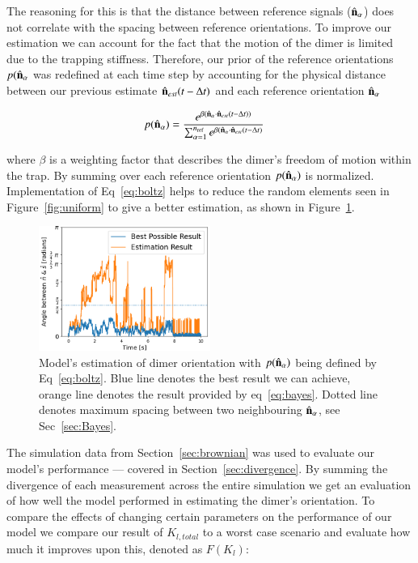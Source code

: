 \documentclass[final,  3p]{elsarticle}
\begin{document}
The reasoning for this is that the distance between reference signals ($\hat{\bf n}_\alpha$) does not correlate with the spacing between reference orientations. To improve our estimation we can account for the fact that the motion of the dimer is limited due to the trapping stiffness. Therefore, our prior of the reference orientations $p(\hat{\bf n}_\alpha$ was redefined at each time step by accounting for the physical distance between our previous estimate $\hat{\bf n}_{est}(t-\Delta t)$ and each reference orientation $\hat{\bf n}_\alpha$

\begin{align}
  p(\hat{\bf n}_\alpha)
  &=\frac{e^{\beta (\hat{\bf n}_\alpha 
  	\cdot \hat{\bf n}_{est}(t-\Delta t))}}
  {\sum_{\alpha=1}^{n_{\rm ref}}
	e^{\beta (\hat{\bf n}_\alpha 
	\cdot \hat{\bf n}_{est}(t-\Delta t)}}
	\label{eq:boltz}
\end{align}

where $\beta$ is a weighting factor that describes the dimer's freedom of motion within the trap. By summing over each reference orientation $p(\hat{\bf n}_\alpha)$ is normalized. Implementation of Eq~\eqref{eq:boltz} helps to reduce the random elements seen in  Figure~\ref{fig:uniform} to give a better estimation, as shown in Figure~\ref{fig:biased}. 

\begin{figure}[h]
	\centering
	\includegraphics[width=0.5\textwidth]{./Images/fig4.png}
	\caption{Model's estimation of dimer orientation with $p(\hat{\bf n}_\alpha)$ being defined by Eq~\eqref{eq:boltz}. Blue line denotes the best result we can achieve, orange line denotes the result provided by eq~\ref{eq:bayes}. Dotted line denotes maximum spacing between two neighbouring $\hat{\bf n}_\alpha$, see Sec~\ref{sec:Bayes}.}
	\label{fig:biased}
\end{figure} 
 
The simulation data from Section~\ref{sec:brownian} was used to evaluate our model's performance --- covered in Section~\ref{sec:divergence}. By summing the divergence of each measurement across the entire simulation we get an evaluation of how well the model performed in estimating the dimer's orientation. To compare the effects of changing certain parameters on the performance of our model we compare our result of $K_{l,total}$ to a worst case scenario and evaluate how much it improves upon this, denoted as $F(K_l)$:
\end{document}
